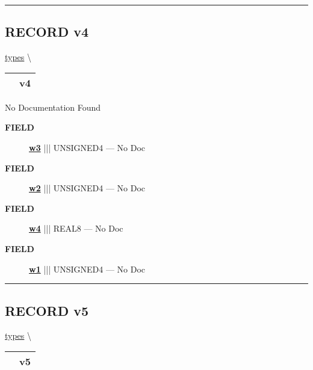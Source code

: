 \rule{\linewidth}{0.5pt}
\subsection*{\textsf{\colorbox{headtoc}{\color{white} RECORD}
v4}}

\hypertarget{ecldoc:types.v4}{}
\hspace{0pt} \hyperlink{ecldoc:types}{types} \textbackslash 

{\renewcommand{\arraystretch}{1.5}
\begin{tabularx}{\textwidth}{|>{\raggedright\arraybackslash}l|X|}
\hline
\hspace{0pt}\mytexttt{\color{red} } & \textbf{v4} \\
\hline
\end{tabularx}
}

\par





No Documentation Found







\par
\begin{description}
\item [\colorbox{tagtype}{\color{white} \textbf{\textsf{FIELD}}}] \textbf{\underline{w3}} ||| UNSIGNED4 --- No Doc
\item [\colorbox{tagtype}{\color{white} \textbf{\textsf{FIELD}}}] \textbf{\underline{w2}} ||| UNSIGNED4 --- No Doc
\item [\colorbox{tagtype}{\color{white} \textbf{\textsf{FIELD}}}] \textbf{\underline{w4}} ||| REAL8 --- No Doc
\item [\colorbox{tagtype}{\color{white} \textbf{\textsf{FIELD}}}] \textbf{\underline{w1}} ||| UNSIGNED4 --- No Doc
\end{description}





\rule{\linewidth}{0.5pt}
\subsection*{\textsf{\colorbox{headtoc}{\color{white} RECORD}
v5}}

\hypertarget{ecldoc:types.v5}{}
\hspace{0pt} \hyperlink{ecldoc:types}{types} \textbackslash 

{\renewcommand{\arraystretch}{1.5}
\begin{tabularx}{\textwidth}{|>{\raggedright\arraybackslash}l|X|}
\hline
\hspace{0pt}\mytexttt{\color{red} } & \textbf{v5} \\
\hline
\end{tabularx}
}

